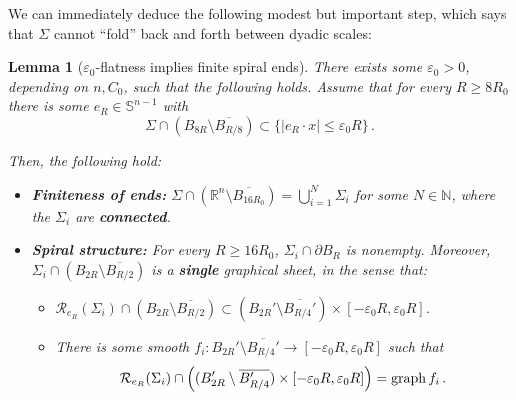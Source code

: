 \documentclass{article}
\newcommand{\N}{\mathbb{N}}
\newcommand{\R}{\mathbb{R}}
\newcommand{\Sp}{\mathbb{S}}
\newcommand{\ep}{\varepsilon}
\newtheorem{lemma}[theorem]{Lemma}
\theoremstyle{definition}
\begin{document}
We can immediately deduce the following modest but important step, which says that $\Sigma$ cannot ``fold'' back and forth between dyadic scales:
\begin{lemma}[$\ep_0$-flatness implies finite spiral ends]\label{lem:spiralstruc}
    There exists some $\ep_0>0$, depending on $n,C_0$, such that the following holds. Assume that for every $R\geq 8R_0$ there is some $e_R\in\Sp^{n-1}$ with
    $$\Sigma \cap (B_{8R}\setminus \overline{B_{R/8}})\subset \{|e_R\cdot x|\leq \ep_0 R\}\,.$$

    Then, the following hold:
    \begin{itemize}
        \item {\bf Finiteness of ends:} $\Sigma \cap (\R^n \setminus \overline{B_{16R_0}})=\bigcup_{i=1}^N \Sigma_i$ for some $N\in\N$, where the $\Sigma_i$ are \textbf{connected}.
        \item {\bf Spiral structure:} For every $R\geq 16R_0$, $\Sigma_i \cap \partial B_R$ is nonempty. Moreover, $\Sigma_i \cap (B_{2R}\setminus \overline{B_{R/2}})$ is a \textbf{single} graphical sheet, in the sense that:
        \begin{itemize}
            \item $\mathcal R_{e_R}(\Sigma_i) \cap (B_{2R}\setminus \overline{B_{R/2}})\subset (B_{2R}'\setminus \overline{B_{R/4}'})\times [-\ep_0R,\ep_0R]$.
            \item There is some smooth $f_i:B_{2R}'\setminus \overline{B_{R/4}'}\to [-\ep_0R,\ep_0R]$ such that
            $$\mathcal R_{e_R}(\Sigma_i) \cap \left((B_{2R}'\setminus \overline{B_{R/4}'})\times[-\ep_0R,\ep_0R]\right)={\rm graph}\, f_i\,.$$
        \end{itemize}
    \end{itemize}
\end{lemma}
\end{document}
